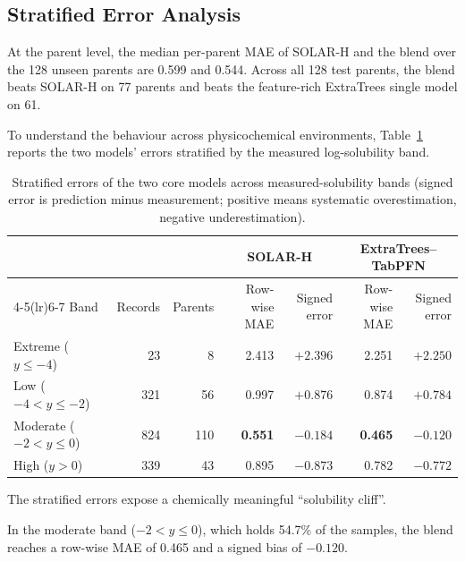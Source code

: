 \subsection{Stratified Error Analysis}

At the parent level, the median per-parent MAE of SOLAR-H and the blend over the 128 unseen parents are 0.599 and 0.544. Across all 128 test parents, the blend beats SOLAR-H on 77 parents and beats the feature-rich ExtraTrees single model on 61.

To understand the behaviour across physicochemical environments, Table~\ref{tab:v2_target_band_errors} reports the two models' errors stratified by the measured log-solubility band.

\begin{table}[htbp]
\centering
\small
\setlength{\tabcolsep}{3.5pt}
\caption{Stratified errors of the two core models across measured-solubility bands (signed error is prediction minus measurement; positive means systematic overestimation, negative underestimation).}
\label{tab:v2_target_band_errors}
\begin{tabular}{lrrrrrr}
\toprule
& & & \multicolumn{2}{c}{SOLAR-H} & \multicolumn{2}{c}{ExtraTrees--TabPFN}\\
\cmidrule(lr){4-5}\cmidrule(lr){6-7}
Band & Records & Parents & Row-wise MAE & Signed error & Row-wise MAE & Signed error \\
\midrule
Extreme ($y \leqslant -4$) & 23 & 8 & 2.413 & $+2.396$ & 2.251 & $+2.250$ \\
Low ($-4 < y \leqslant -2$) & 321 & 56 & 0.997 & $+0.876$ & 0.874 & $+0.784$ \\
Moderate ($-2 < y \leqslant 0$) & 824 & 110 & \textbf{0.551} & $-0.184$ & \textbf{0.465} & $-0.120$ \\
High ($y > 0$) & 339 & 43 & 0.895 & $-0.873$ & 0.782 & $-0.772$ \\
\bottomrule
\end{tabular}
\end{table}

The stratified errors expose a chemically meaningful ``solubility cliff''.

In the moderate band ($-2 < y \le 0$), which holds 54.7\% of the samples, the blend reaches a row-wise MAE of 0.465 and a signed bias of $-0.120$.

